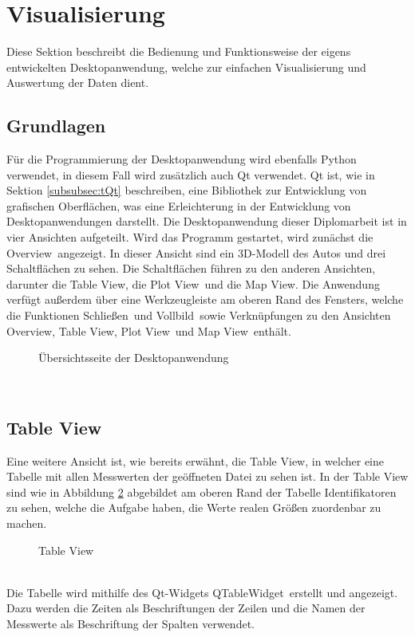 \section{Visualisierung}
\label{sec:DesktopApp}
Diese Sektion beschreibt die Bedienung und Funktionsweise der eigens entwickelten Desktopanwendung, welche zur einfachen Visualisierung und Auswertung der Daten dient.
\subsection{Grundlagen}
\label{subsec:VisGrundlagen}
Für die Programmierung der Desktopanwendung wird ebenfalls Python verwendet, in diesem Fall wird zusätzlich auch Qt verwendet. Qt ist, wie in Sektion \ref{subsubsec:tQt} beschreiben, eine Bibliothek zur Entwicklung von grafischen Oberflächen, was eine Erleichterung in der Entwicklung von Desktopanwendungen darstellt. Die Desktopanwendung dieser Diplomarbeit ist in vier Ansichten aufgeteilt. Wird das Programm gestartet, wird zunächst die \glqq Overview\grqq\ angezeigt. In dieser Ansicht sind ein \ac{3D}-Modell des Autos und drei Schaltflächen zu sehen. Die Schaltflächen führen zu den anderen Ansichten, darunter die \glqq Table View\grqq , die \glqq Plot View\grqq \ und die \glqq Map View\grqq . Die Anwendung verfügt außerdem über eine Werkzeugleiste am oberen Rand des Fensters, welche die Funktionen \glqq Schließen\grqq\ und \glqq Vollbild\grqq\ sowie Verknüpfungen zu den Ansichten \glqq Overview\grqq , \glqq Table View\grqq , \glqq Plot View\grqq\  und \glqq Map View\grqq\ enthält.
\begin{figure}[h]
\centering
\missingfigure{}
\caption{Übersichtsseite der Desktopanwendung}
\label{fig:Overview}
\end{figure}
\\
\subsection{Table View}
\label{subsec:VisTableView}
Eine weitere Ansicht ist, wie bereits erwähnt, die \glqq Table View\grqq , in welcher eine Tabelle mit allen Messwerten der geöffneten Datei zu sehen ist. In der Table View sind wie in Abbildung \ref{fig:TableView} abgebildet am oberen Rand der Tabelle Identifikatoren zu sehen, welche die Aufgabe haben, die Werte realen Größen zuordenbar zu machen.
\begin{figure}[h]
\centering
\missingfigure{}
\caption{Table View}
\label{fig:TableView}
\end{figure}
\\
Die Tabelle wird mithilfe des Qt-Widgets \glqq QTableWidget\grqq\ erstellt und angezeigt. Dazu werden die Zeiten als Beschriftungen der Zeilen und die Namen der Messwerte als Beschriftung der Spalten verwendet. 

